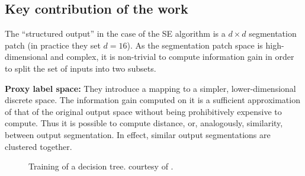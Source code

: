 \subsection{Key contribution of the work}
The ``structured output'' in the case of the SE algorithm is a $d\times d$ segmentation patch (in practice they set $d = 16$). 
As the segmentation patch space is high-dimensional and complex, it is non-trivial to compute information gain in order to split the set of inputs into two subsets.

\textbf{Proxy label space:} They introduce a mapping to a simpler, lower-dimensional discrete space. The information gain computed on it is a sufficient approximation of that of the original output space without being prohibitively expensive to compute. Thus it is possible to compute distance, or, analogously, similarity, between output segmentation. In effect, similar output segmentations are clustered together.

\begin{figure}[ht!]
\centering
\caption[Training of a structured decision tree]{Training of a decision tree. \protect{} courtesy of \cite{DollarICCV13PresentationSlides}.}
\label{fig:srf-training}
\end{figure}


